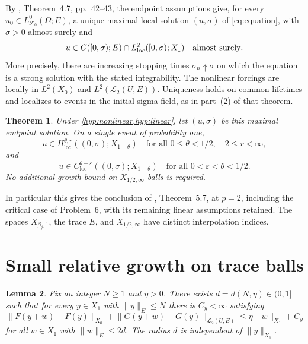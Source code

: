 \documentclass[11pt]{amsart}
\newtheorem{theorem}{Theorem}[section]
\newtheorem{lemma}[theorem]{Lemma}
\theoremstyle{definition}
\theoremstyle{remark}
\newcommand{\loc}{\mathrm{loc}}
\newcommand{\HS}{\mathcal L_2(U,E)}
\newcommand{\norm}[2][]{\lVert #2\rVert_{#1}}
\numberwithin{equation}{section}
\begin{document}
By \cite{Survey}, Theorem~4.7, pp.~42--43, the endpoint assumptions give,
for every $u_0\in L^0_{\mathcal F_0}(\Omega;E)$, a unique maximal local
solution $(u,\sigma)$ of \eqref{eq:equation}, with $\sigma>0$ almost surely and
\begin{equation}\label{eq:energy}
 u\in C([0,\sigma);E)\cap L^2_\loc([0,\sigma);X_1)\quad\hbox{almost surely}.
\end{equation}
More precisely, there are increasing stopping times $\sigma_n\uparrow\sigma$
on which the equation is a strong solution with the stated integrability.
The nonlinear forcings are locally in $L^2(X_0)$ and $L^2(\HS)$.
Uniqueness holds on common lifetimes and localizes to events in the
initial sigma-field, as in part~(2) of that theorem.

\begin{theorem}\label{thm:main}
Under \cref{hyp:nonlinear,hyp:linear}, let $(u,\sigma)$ be this maximal
endpoint solution. On a single event of probability one,
\begin{equation}\label{eq:conclusion}
 u\in H^{\theta,r}_\loc((0,\sigma);X_{1-\theta})
 \quad\text{for all }0\le\theta<1/2,\quad 2\le r<\infty,
\end{equation}
and
\begin{equation}\label{eq:holder}
 u\in C^{\theta-\varepsilon}_\loc((0,\sigma);X_{1-\theta})
 \quad\text{for all }0<\varepsilon<\theta<1/2.
\end{equation}
No additional growth bound on $X_{1/2,\infty}$-balls is required.
\end{theorem}

In particular this gives the conclusion of \cite{Survey}, Theorem~5.7,
at $p=2$, including the critical case of Problem~6, with its remaining
linear assumptions retained. The spaces $X_{\beta_j,1}$, the trace $E$,
and $X_{1/2,\infty}$ have distinct interpolation indices.

\section{Small relative growth on trace balls}

\begin{lemma}\label{lem:small}
Fix an integer $N\ge1$ and $\eta>0$. There exists $d=d(N,\eta)\in(0,1]$
such that for every $y\in X_1$ with $\norm[E]{y}\le N$ there is
$C_y<\infty$ satisfying
\begin{equation}\label{eq:small}
 \norm[X_0]{F(y+w)-F(y)}+\norm[\HS]{G(y+w)-G(y)}
 \le\eta\norm[X_1]{w}+C_y
\end{equation}
for all $w\in X_1$ with $\norm[E]{w}\le2d$.
The radius $d$ is independent of $\norm[X_1]{y}$.
\end{lemma}
\end{document}
